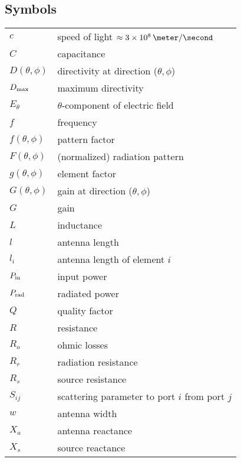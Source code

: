\subsection*{Symbols}

\begin{tabular}{ll}

$c$           & speed of light $\approx 3\times10^8\,\meter/\second$\\
$C$           & capacitance\\
$D(\theta,\phi)$  & directivity at direction ($\theta,\phi$)\\
${D}_{\mathrm{max}}$    & maximum directivity\\
$E_\theta$   & $\theta$-component of electric field\\
$f$          & frequency\\
$f(\theta,\phi)$ & pattern factor\\
$F(\theta,\phi)$ & (normalized) radiation pattern\\
$g(\theta,\phi)$ & element factor\\
$G(\theta,\phi)$ & gain at direction ($\theta,\phi$)\\
$G$          & gain\\
$L$          & inductance\\
$l$          & antenna length\\
$l_i$        & antenna length of element $i$\\
${P}_{\mathrm{in}}$     & input power\\
${P}_{\mathrm{rad}}$    & radiated power\\
$Q$          & quality factor\\
$R$          & resistance\\
$R_o$        & ohmic losses\\
$R_r$        & radiation resistance\\
$R_s$        & source resistance\\
$S_{ij}$     & scattering parameter to port $i$ from port $j$ \\
$w$          & antenna width\\
$X_a$        & antenna reactance\\
$X_s$        & source reactance\\

\end{tabular}
